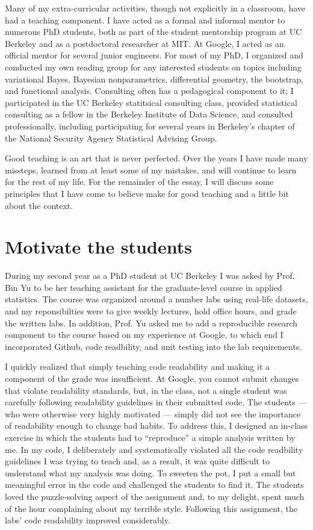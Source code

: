 Many of my extra-curricular activities, though not explicitly in a classroom,
have had a teaching component.  I have acted as a formal and informal mentor to
numerous PhD students, both as part of the student mentorship program at UC
Berkeley and as a postdoctoral researcher at MIT.  At Google, I acted as an
official mentor for several junior engineers. For most of my PhD, I organized
and conducted my own reading group for any interested students on topics
including variational Bayes, Bayesian nonparametrics, differential geometry, the
bootstrap, and functional analysis. Consulting often has a pedagogical component
to it; I participated in the UC Berkeley statitsical consulting class, provided
statistical consulting as a fellow in the Berkeley Institute of Data Science,
and consulted professionally, including participating for several years in
Berkeley's chapter of the National Security Agency Statistical Advising Group.

Good teaching is an art that is never perfected.  Over the years I have made
many missteps, learned from at least some of my mistakes, and will continue to
learn for the rest of my life.  For the remainder of the essay, I will discuss
some principles that I have come to believe make for good teaching and a
little bit about the context.


\section{Motivate the students}

During my second year as a PhD student at UC Berkeley I was asked by Prof. Bin
Yu to be her teaching assistant for the graduate-level course in applied
statistics.  The course was organized around a number labs using real-life
datasets, and my reponsibilties were to give weekly lectures, hold office hours,
and grade the written labs.  In addition, Prof. Yu asked me to add a
reproducible research component to the course based on my experience at Google,
to which end I incorporated Github, code readbility, and unit testing into
the lab requirements.

I quickly realized that simply teaching code readability and making it a
component of the grade was insufficient.  At Google, you cannot submit changes
that violate readability standards, but, in the class, not a single student was
carefully following readability guidelines in their submitted code.  The
students --- who were otherwise very highly motivated --- simply did not see the
importance of readability enough to change bad habits.  To address this, I
designed an in-class exercise in which the students had to ``reproduce'' a
simple analysis written by me.  In my code, I deliberately and systematically
violated all the code readbility guidelines I was trying to teach and, as a
result, it was quite difficult to understand what my analysis was doing.  To
sweeten the pot, I put a small but meaningful error in the code and challenged
the students to find it.  The students loved the puzzle-solving aspect of the
assignment and, to my delight, spent much of the hour complaining about my
terrible style.  Following this assignment, the labs' code readability improved
considerably.

